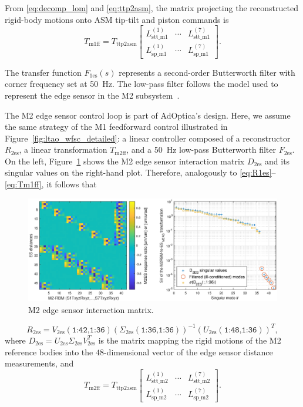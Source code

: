 \documentclass{gmto}
\begin{document}
From \eqref{eq:decomp_lom} and \eqref{eq:ttp2asm}, the matrix projecting the reconstructed rigid-body motions onto ASM tip-tilt and piston commands is
\begin{equation} \label{eq:Tm1ff}
    T_\text{m1ff} =     T_\text{ttp2asm} \begin{bmatrix}
        L_\text{stt\_m1}^{(1)} & \cdots & L_\text{stt\_m1}^{(7)} \\ L_\text{sp\_m1}^{(1)} & \cdots & L_\text{sp\_m1}^{(7)} 
    \end{bmatrix}.
\end{equation}

The transfer function $F_{1\text{es}}(s)$ represents a second-order Butterworth filter with corner frequency set at \SI{50}{\hertz}. The low-pass filter follows the model used to represent the edge sensor in the M2 subsystem~\cite{ADP_PhasingRep2021}.

The M2 edge sensor control loop is part of AdOptica's design. Here, we assume the same strategy of the M1 feedforward control illustrated in Figure~\ref{fig:ltao_wfsc_detailed}: a linear controller composed of a reconstructor $R_{2\text{es}}$, a linear transformation $T_\text{m2ff}$, and a \SI{50}{\hertz} low-pass Butterworth filter $F_{2\text{es}}$. %
On the left, Figure~\ref{fig:D2es_sv} shows the M2 edge sensor interaction matrix $D_{2\text{es}}$ and its singular values on the right-hand plot.
%
Therefore, analogously to \eqref{eq:R1es}--\eqref{eq:Tm1ff}, it follows that
%
\begin{figure}[!hbt]
  \centering
  \includegraphics[trim=60 0 60 0, clip, width=\textwidth]{D2es_map_sv.eps}
  \caption{M2 edge sensor interaction matrix.}
  \label{fig:D2es_sv}
\end{figure}
%
\begin{equation*}
  R_{2\text{es}} = V_{2\text{es}}(\texttt{1:42,1:36}) \left(\Sigma_{2\text{es}}(\texttt{1:36,1:36})\right)^{-1} \left(U_{2\text{es}}(\texttt{1:48,1:36})\right)^T,
\end{equation*}
where $D_{2\text{es}} = U_{2\text{es}} \Sigma_{2\text{es}} V_{2\text{es}}^T$ is the matrix mapping the rigid motions of the M2 reference bodies into the $48$-dimensional vector of the edge sensor distance measurements, and
\begin{equation*}
  T_\text{m2ff} =     T_\text{ttp2asm} \begin{bmatrix}
    L_\text{stt\_m2}^{(1)} & \cdots & L_\text{stt\_m2}^{(7)} \\ L_\text{sp\_m2}^{(1)} & \cdots & L_\text{sp\_m2}^{(7)} 
\end{bmatrix}.
\end{equation*}
\end{document}
